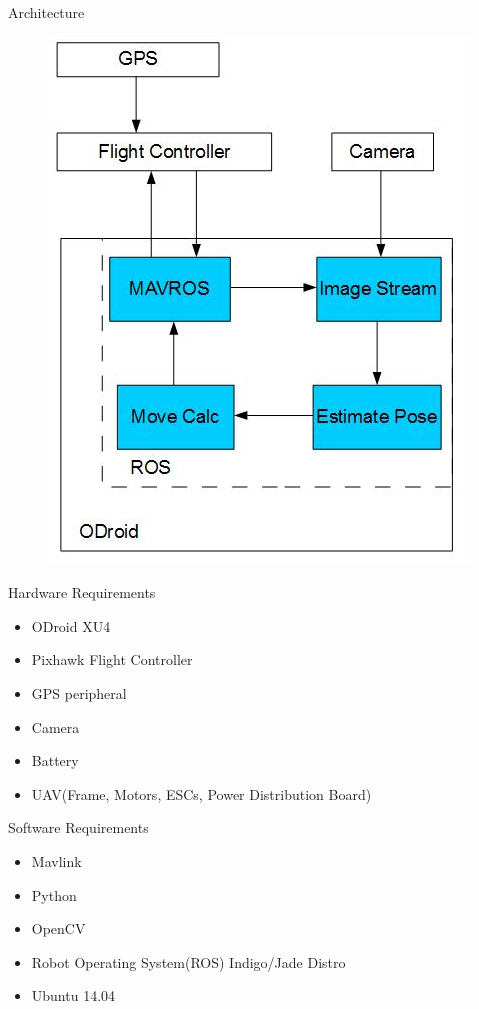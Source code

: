 \documentclass[11pt]{beamer}
\begin{document}
\begin{frame}{Architecture}
\begin{figure}
\includegraphics[width=.5\textwidth]{images/broad_approach1}
\end{figure}

\end{frame}

\begin{frame}{Hardware Requirements}
\begin{itemize}
\item ODroid XU4
\item Pixhawk Flight Controller
\item GPS peripheral
\item Camera
\item Battery
\item UAV(Frame, Motors, ESCs, Power Distribution Board)
\end{itemize}

\end{frame}

\begin{frame}{Software Requirements}
\begin{itemize}
\item Mavlink
\item Python
\item OpenCV
\item Robot Operating System(ROS) Indigo/Jade Distro
\item Ubuntu 14.04
\end{itemize}

\end{frame}
\end{document}
